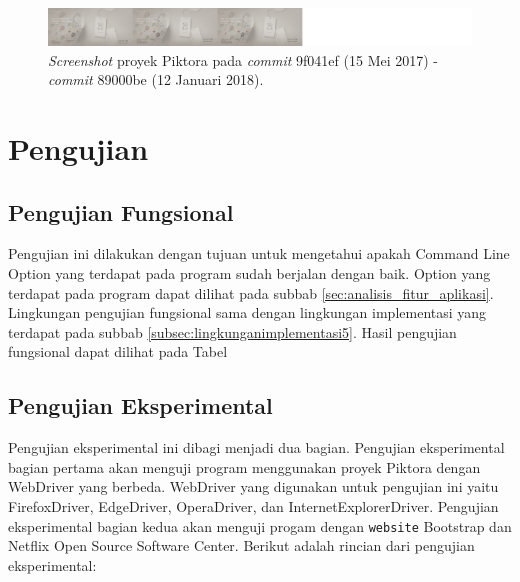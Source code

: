 \begin{enumerate}
\begin{figure}[H]
	
		\includegraphics[scale=0.3]{Gambar/Untitled-12.png}
	\caption{\textit{Screenshot} proyek Piktora pada \textit{commit} 9f041ef (15 Mei 2017) - \textit{commit} 89000be (12 Januari 2018).}
	\label{fig:c12}
\end{figure}


\end{enumerate}
\section{Pengujian}
\label{sec:pengujian}

\subsection{Pengujian Fungsional}
\label{sec:pengujian_fungsional} 
Pengujian ini dilakukan dengan tujuan untuk mengetahui apakah Command Line Option yang terdapat pada program sudah berjalan dengan baik. Option yang terdapat pada program dapat dilihat pada subbab \ref{sec:analisis_fitur_aplikasi}. Lingkungan pengujian fungsional sama dengan lingkungan implementasi yang terdapat pada subbab \ref{subsec:lingkunganimplementasi5}. Hasil pengujian fungsional dapat dilihat pada Tabel 

\subsection{Pengujian Eksperimental}
\label{sec:pengujian_eksperimental} 
Pengujian eksperimental ini dibagi menjadi dua bagian. Pengujian eksperimental bagian pertama akan menguji program menggunakan proyek Piktora dengan WebDriver yang berbeda. WebDriver yang digunakan untuk pengujian ini yaitu FirefoxDriver, EdgeDriver, OperaDriver, dan InternetExplorerDriver. Pengujian eksperimental bagian kedua akan menguji progam dengan \texttt{website} Bootstrap dan Netflix Open Source Software Center. Berikut adalah rincian dari pengujian eksperimental:

